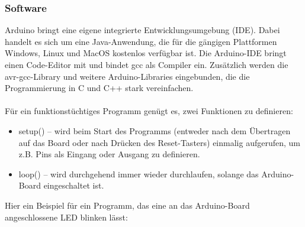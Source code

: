 \subsubsection{Software}
Arduino bringt eine eigene integrierte Entwicklungsumgebung (IDE). Dabei handelt es sich um eine Java-Anwendung, die für die gängigen Plattformen Windows, Linux und MacOS kostenlos verfügbar ist. Die Arduino-IDE bringt einen Code-Editor mit und bindet gcc als Compiler ein. Zusätzlich werden die avr-gcc-Library und weitere Arduino-Libraries eingebunden, die die Programmierung in C und C++ stark vereinfachen.\\
\\
Für ein funktionstüchtiges Programm genügt es, zwei Funktionen zu definieren:
\begin{itemize}
\item setup() – wird beim Start des Programms (entweder nach dem Übertragen auf das Board oder nach Drücken des Reset-Tasters) einmalig aufgerufen, um z.B. Pins als Eingang oder Ausgang zu definieren.
\item loop() – wird durchgehend immer wieder durchlaufen, solange das Arduino-Board eingeschaltet ist.
\end{itemize}
Hier ein Beispiel für ein Programm, das eine an das Arduino-Board angeschlossene LED blinken lässt:\\
\ \\
\ \\
\cite{arduino_wiki}
